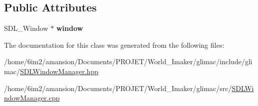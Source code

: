 \subsection*{Public Attributes}
\begin{DoxyCompactItemize}
\item 
\mbox{\label{classglimac_1_1SDLWindowManager_a5999492fdc73a660c624015485a8a71e}} 
S\+D\+L\+\_\+\+Window $\ast$ {\bfseries window}
\end{DoxyCompactItemize}


The documentation for this class was generated from the following files\+:\begin{DoxyCompactItemize}
\item 
/home/6im2/amansion/\+Documents/\+P\+R\+O\+J\+E\+T/\+World\+\_\+\+Imaker/glimac/include/glimac/\hyperlink{SDLWindowManager_8hpp}{S\+D\+L\+Window\+Manager.\+hpp}\item 
/home/6im2/amansion/\+Documents/\+P\+R\+O\+J\+E\+T/\+World\+\_\+\+Imaker/glimac/src/\hyperlink{SDLWindowManager_8cpp}{S\+D\+L\+Window\+Manager.\+cpp}\end{DoxyCompactItemize}
